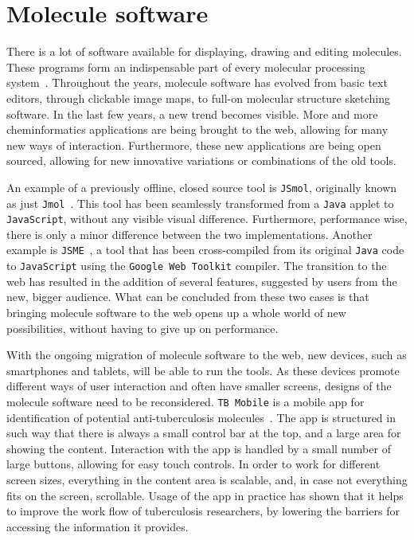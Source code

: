 \section{Molecule software}
There is a lot of software available for displaying, drawing and editing molecules. These programs form an indispensable part of every molecular processing system~\cite{ertl2010molecular}. Throughout the years, molecule software has evolved from basic text editors, through clickable image maps, to full-on molecular structure sketching software. In the last few years, a new trend becomes visible. More and more cheminformatics applications are being brought to the web, allowing for many new ways of interaction. Furthermore, these new applications are being open sourced, allowing for new innovative variations or combinations of the old tools.

An example of a previously offline, closed source tool is \verb|JSmol|, originally known as just \verb|Jmol|~\cite{hanson2013jsmol}. This tool has been seamlessly transformed from a \verb|Java| applet to \verb|JavaScript|, without any visible visual difference. Furthermore, performance wise, there is only a minor difference between the two implementations. Another example is \verb|JSME|~\cite{bienfait2013jsme}, a tool that has been cross-compiled from its original \verb|Java| code to \verb|JavaScript| using the \verb|Google Web Toolkit| compiler. The transition to the web has resulted in the addition of several features, suggested by users from the new, bigger audience. What can be concluded from these two cases is that bringing molecule software to the web opens up a whole world of new possibilities, without having to give up on performance.

With the ongoing migration of molecule software to the web, new devices, such as smartphones and tablets, will be able to run the tools. As these devices promote different ways of user interaction and often have smaller screens, designs of the molecule software need to be reconsidered. \verb|TB Mobile| is a mobile app for identification of potential anti-tuberculosis molecules~\cite{ekins2013tb}. The app is structured in such way that there is always a small control bar at the top, and a large area for showing the content. Interaction with the app is handled by a small number of large buttons, allowing for easy touch controls. In order to work for different screen sizes, everything in the content area is scalable, and, in case not everything fits on the screen, scrollable. Usage of the app in practice has shown that it helps to improve the work flow of tuberculosis researchers, by lowering the barriers for accessing the information it provides.

